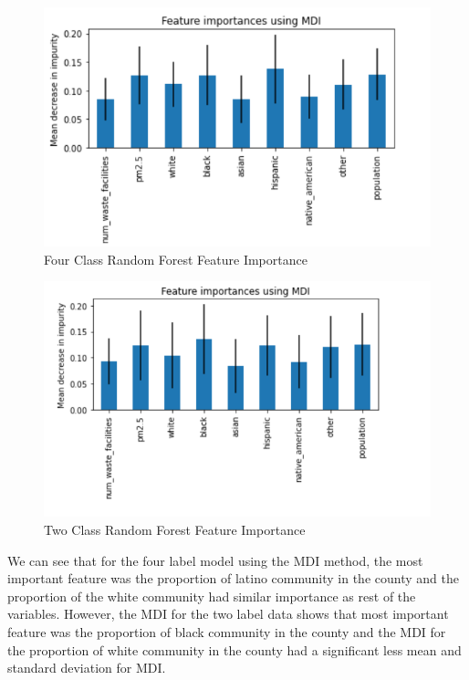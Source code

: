 \documentclass{article}
\begin{document}
\begin{figure}[h]
\caption{Four Class Random Forest Feature Importance}
\includegraphics[scale=0.45]{MDI1.PNG}
\end{figure}

\begin{figure}[h]
\caption{Two Class Random Forest Feature Importance} 
\includegraphics[scale=0.45]{MDI2.PNG}
\end{figure}


We can see that for the four label model using the MDI method, the most important feature was the proportion of latino community in the county and the proportion of the white community had similar importance as rest of the variables. However, the MDI for the two label data shows that most important feature was the proportion of black community in the county and the MDI for the proportion of white community in the county had a significant less mean and standard deviation for MDI.
\end{document}
